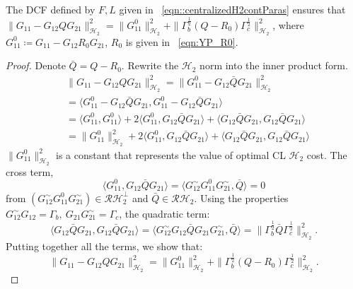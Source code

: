 \begin{lemma}
The DCF defined by \(F,L\) given in ~\eqref{eqn::centralizedH2contParas} ensures that \(\|G_{11} - G_{12} Q G_{21}\|_{\mathcal{H}_2}^2 = \|G_{11}^0\|_{\mathcal{H}_2}^2 + \|\Gamma_b^{\frac{1}{2}}(Q-R_0) \Gamma_c^{\frac{1}{2}}\|_{\mathcal{H}_2}^2\), 
where \(G_{11}^0 \coloneqq G_{11}- G_{12} R_0 G_{21}\), \(R_0\) is given in ~\eqref{eqn:YP_R0}.
\end{lemma}
\begin{proof}
Denote \(\bar{Q} = Q - R_0\). Rewrite the \(\mathcal{H}_2\) norm into the inner product form.
\begin{equation*}
\begin{split}
    & \|G_{11} - G_{12} Q G_{21}\|_{\mathcal{H}_2}^2 = \|G_{11}^0 - G_{12} \bar{Q} G_{21}\|_{\mathcal{H}_2}^2 \\
    & = \langle G_{11}^0 - G_{12} \bar{Q} G_{21}, G_{11}^0 - G_{12} \bar{Q} G_{21}\rangle\\
    & = \langle G_{11}^0, G_{11}^0 \rangle + 2\langle G_{11}^0,G_{12}\bar{Q} G_{21}\rangle + \langle G_{12} \bar{Q} G_{21}, G_{12} \bar{Q} G_{21}\rangle \\
    & = \| G_{11}^0\|_{\mathcal{H}_2}^2 +2\langle G_{11}^0,G_{12}\bar{Q} G_{21}\rangle + \langle G_{12} \bar{Q} G_{21}, G_{12} \bar{Q} G_{21}\rangle
\end{split}
\end{equation*}
\(\|G_{11}^0\|_{\mathcal{H}_2}^2\) is a constant that represents the value of optimal CL \(\mathcal{H}_2\) cost. The cross term,
\begin{equation}
    \langle G_{11}^0,G_{12}\bar{Q} G_{21}\rangle = \langle G_{12}^{\sim} G_{11}^0 G_{21}^{\sim},\bar{Q}\rangle =0
\end{equation}
from \((G_{12}^{\sim} G_{11}^0 G_{21}^{\sim}) \in \mathcal{RH}_2^\perp\) and \(\bar{Q}\in \mathcal{RH}_2\). Using the properties \(
G_{12}^{\sim} G_{12} =\Gamma_b, \ G_{21} G_{21}^{\sim} =\Gamma_c\),
the quadratic term:
\begin{equation*}
    \langle G_{12} \bar{Q} G_{21}, G_{12} \bar{Q} G_{21}\rangle = \langle G_{12}^{\sim} G_{12}\bar{Q}G_{21} G_{21}^{\sim},\bar{Q}\rangle 
    = \|\Gamma_b^{\frac{1}{2}}\bar{Q} \Gamma_c^{\frac{1}{2}}\|_{\mathcal{H}_2}^2.
\end{equation*}
Putting together all the terms, we show that: 
\[
\|G_{11} - G_{12} Q G_{21}\|_{\mathcal{H}_2}^2= \|G_{11}^0\|_{\mathcal{H}_2}^2 + \|\Gamma_b^{\frac{1}{2}}(Q-R_0) \Gamma_c^{\frac{1}{2}}\|_{\mathcal{H}_2}^2.
\]
\end{proof}
